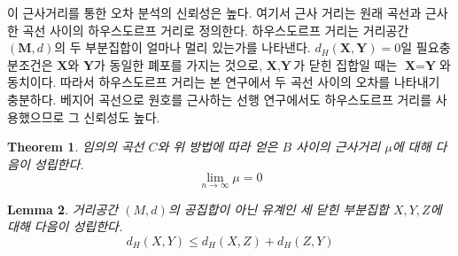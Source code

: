 \documentclass{gshs_thesis}
\theoremstyle{theorem}
\newtheorem{theorem}{Theorem}[section]
\theoremstyle{lemma}
\newtheorem{lemma}[theorem]{Lemma}
\theoremstyle{definition}
\begin{document}
 
이 근사거리를 통한 오차 분석의 신뢰성은 높다. 여기서 근사 거리는 원래 곡선과 근사한 곡선 사이의 하우스도르프 거리로 정의한다. 하우스도르프 거리는 거리공간 $(\textbf{M},d)$의 두 부분집합이 얼마나 멀리 있는가를 나타낸다. $d_{H}(\textbf{X},\textbf{Y})=0$일 필요충분조건은 $\textbf{X}$와 $\textbf{Y}$가 동일한 폐포를 가지는 것으로, $\textbf{X},\textbf{Y}$가 닫힌 집합일 때는 $\textbf{X}=\textbf{Y}$와 동치이다. 따라서 하우스도르프 거리는 본 연구에서 두 곡선 사이의 오차를 나타내기 충분하다. 베지어 곡선으로 원호를 근사하는 선행 연구에서도 하우스도르프 거리를 사용했으므로 그 신뢰성도 높다. \cite{Seon-Hong Kim}
\begin{theorem}\label{2Dproof}
	임의의 곡선 $C$와 위 방법에 따라 얻은 $B$ 사이의 근사거리 $\mu$에 대해 다음이 성립한다.
	\begin{equation}
		\lim_{n\to\infty}\mu=0
	\end{equation}
\end{theorem}
\begin{lemma}
	거리공간 $(M,d)$의 공집합이 아닌 유계인 세 닫힌 부분집합 $X,Y,Z$에 대해 다음이 성립한다.
	\begin{equation}
		d_{H}(X,Y)\leq{d_{H}(X,Z)+d_{H}(Z,Y)}
	\end{equation}
\end{lemma}
\end{document}
